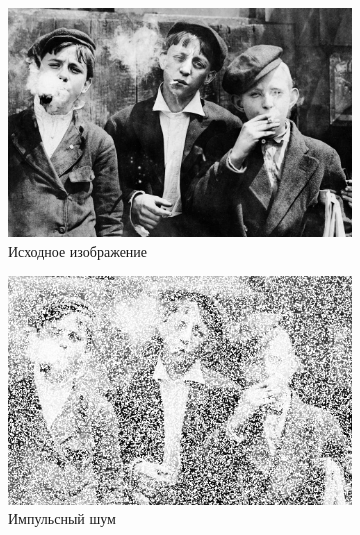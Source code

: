 \begin{figure}[ht] 
    \centering
    \begin{subfigure}[b]{0.5\linewidth}
        \centering
        \includegraphics[width=0.95\linewidth]{../lewis-hine-taschen-main-3.jpg} 
        \caption{Исходное изображение} 
        \label{rang_3_9:a} 
        \vspace{4ex}
    \end{subfigure}%
    \begin{subfigure}[b]{0.5\linewidth}
      \centering
      \includegraphics[width=0.95\linewidth]{../Rang_Filter/Rang_Impulse_noise_(k=3,r=9).jpg} 
      \caption{Импульсный шум} 
      \label{rang_3_9:b} 
      \vspace{4ex}
    \end{subfigure}
    \begin{subfigure}[b]{0.5\linewidth}
      \centering

\end{subfigure}
\end{figure}
